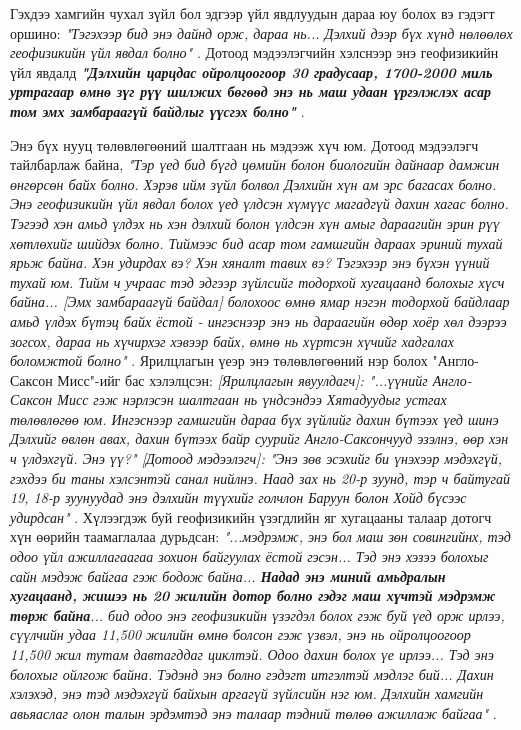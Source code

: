 \documentclass[10pt,twocolumn,letterpaper]{article}
\begin{document}
Гэхдээ хамгийн чухал зүйл бол эдгээр үйл явдлуудын дараа юу болох вэ гэдэгт оршино: \textit{"Тэгэхээр бид энэ дайнд орж, дараа нь... Дэлхий дээр бүх хүнд нөлөөлөх геофизикийн үйл явдал болно"} \cite{4}. Дотоод мэдээлэгчийн хэлснээр энэ геофизикийн үйл явдалд \textit{\textbf{"Дэлхийн царцдас ойролцоогоор 30 градусаар, 1700-2000 миль уртрагаар өмнө зүг рүү шилжих бөгөөд энэ нь маш удаан үргэлжлэх асар том эмх замбараагүй байдлыг үүсгэх болно"}} \cite{4}.

Энэ бүх нууц төлөвлөгөөний шалтгаан нь мэдээж хүч юм. Дотоод мэдээлэгч тайлбарлаж байна, \textit{"Тэр үед бид бүгд цөмийн болон биологийн дайнаар дамжин өнгөрсөн байх болно. Хэрэв ийм зүйл болвол Дэлхийн хүн ам эрс багасах болно. Энэ геофизикийн үйл явдал болох үед үлдсэн хүмүүс магадгүй дахин хагас болно. Тэгээд хэн амьд үлдэх нь хэн дэлхий болон үлдсэн хүн амыг дараагийн эрин рүү хөтлөхийг шийдэх болно. Тиймээс бид асар том гамшгийн дараах эриний тухай ярьж байна. Хэн удирдах вэ? Хэн хяналт тавих вэ? Тэгэхээр энэ бүхэн үүний тухай юм. Тийм ч учраас тэд эдгээр зүйлсийг тодорхой хугацаанд болохыг хүсч байна... [Эмх замбараагүй байдал] болохоос өмнө ямар нэгэн тодорхой байдлаар амьд үлдэх бүтэц байх ёстой - ингэснээр энэ нь дараагийн өдөр хоёр хөл дээрээ зогсох, дараа нь хүчирхэг хэвээр байх, өмнө нь хүртсэн хүчийг хадгалах боломжтой болно"} \cite{4}. Ярилцлагын үеэр энэ төлөвлөгөөний нэр болох "Англо-Саксон Мисс"-ийг бас хэлэлцсэн: \textit{[Ярилцлагын явуулдагч]: "...үүнийг Англо-Саксон Мисс гэж нэрлэсэн шалтгаан нь үндсэндээ Хятадуудыг устгах төлөвлөгөө юм. Ингэснээр гамшгийн дараа бүх зүйлийг дахин бүтээх үед шинэ Дэлхийг өвлөн авах, дахин бүтээх байр суурийг Англо-Саксончууд эзэлнэ, өөр хэн ч үлдэхгүй. Энэ үү?" [Дотоод мэдээлэгч]: "Энэ зөв эсэхийг би үнэхээр мэдэхгүй, гэхдээ би таны хэлсэнтэй санал нийлнэ. Наад зах нь 20-р зуунд, тэр ч байтугай 19, 18-р зуунуудад энэ дэлхийн түүхийг голчлон Баруун болон Хойд бүсээс удирдсан"} \cite{4}.
Хүлээгдэж буй геофизикийн үзэгдлийн яг хугацааны талаар дотогч хүн өөрийн таамаглалаа дурьдсан: \textit{"...мэдрэмж, энэ бол маш зөн совингийнх, тэд одоо үйл ажиллагаагаа зохион байгуулах ёстой гэсэн... Тэд энэ хэзээ болохыг сайн мэдэж байгаа гэж бодож байна... \textbf{Надад энэ миний амьдралын хугацаанд, жишээ нь 20 жилийн дотор болно гэдэг маш хүчтэй мэдрэмж төрж байна}... бид одоо энэ геофизикийн үзэгдэл болох гэж буй үед орж ирлээ, сүүлчийн удаа 11,500 жилийн өмнө болсон гэж үзвэл, энэ нь ойролцоогоор 11,500 жил тутам давтагддаг циклтэй. Одоо дахин болох үе ирлээ... Тэд энэ болохыг ойлгож байна. Тэдэнд энэ болно гэдэгт итгэлтэй мэдлэг бий... Дахин хэлэхэд, энэ тэд мэдэхгүй байхын аргагүй зүйлсийн нэг юм. Дэлхийн хамгийн авьяаслаг олон талын эрдэмтэд энэ талаар тэдний төлөө ажиллаж байгаа"} \cite{4}.
\end{document}
